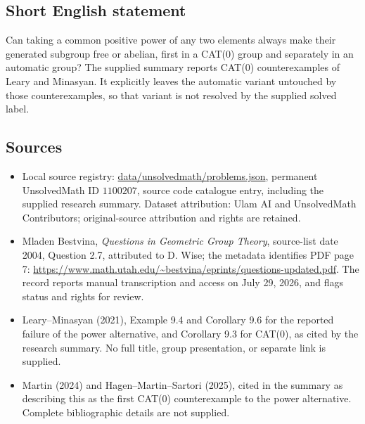 \documentclass[11pt]{article}
\begin{document}
\subsection{Short English statement}
Can taking a common positive power of any two elements always make their generated subgroup free or abelian, first in a CAT(0) group and separately in an automatic group? The supplied summary reports CAT(0) counterexamples of Leary and Minasyan. It explicitly leaves the automatic variant untouched by those counterexamples, so that variant is not resolved by the supplied solved label.
\subsection{Sources}
\begin{itemize}
\item Local source registry: \url{data/unsolvedmath/problems.json}, permanent UnsolvedMath ID $1100207$, source code catalogue entry, including the supplied research summary. Dataset attribution: Ulam AI and UnsolvedMath Contributors; original-source attribution and rights are retained.
\item Mladen Bestvina, \emph{Questions in Geometric Group Theory}, source-list date 2004, Question 2.7, attributed to D. Wise; the metadata identifies PDF page 7: \url{https://www.math.utah.edu/~bestvina/eprints/questions-updated.pdf}. The record reports manual transcription and access on July 29, 2026, and flags status and rights for review.
\item Leary--Minasyan (2021), Example 9.4 and Corollary 9.6 for the reported failure of the power alternative, and Corollary 9.3 for CAT(0), as cited by the research summary. No full title, group presentation, or separate link is supplied.
\item Martin (2024) and Hagen--Martin--Sartori (2025), cited in the summary as describing this as the first CAT(0) counterexample to the power alternative. Complete bibliographic details are not supplied.
\end{itemize}
\end{document}
